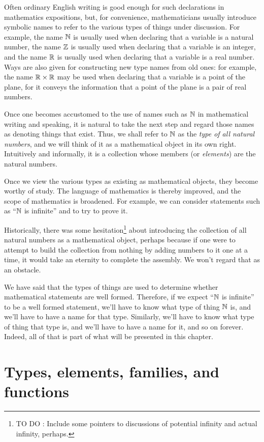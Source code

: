 Often ordinary English writing is good enough for such declarations in mathematics expositions, but, for convenience, mathematicians usually
introduce symbolic names to refer to the various types of things under discussion.  For example, the name $\mathbb{N}$ is usually used when declaring
that a variable is a natural number, the name $\mathbb{Z}$ is usually used when declaring that a variable is an integer, and the name $\mathbb{R}$ is usually
used when declaring that a variable is a real number.  Ways are also given for constructing new type names from old ones: for example, the name
$\mathbb{R}\times\mathbb{R}$ may be used when declaring that a variable is a point of the plane, for it conveys the information that a point of the plane is a
pair of real numbers.

Once one becomes accustomed to the use of names such as $\mathbb{N}$ in mathematical writing and speaking, it is natural to take the next step and
regard those names as denoting things that exist.  Thus, we shall refer to $\mathbb{N}$ as the \emph{type of all natural numbers}, and we will think of
it as a mathematical object in its own right.  Intuitively and informally, it is a collection whose members (or \emph{elements}) are the natural
numbers.

Once we view the various types as existing as mathematical objects, they become worthy of study.  The language of mathematics is thereby
improved, and the scope of mathematics is broadened.  For example, we can consider statements such as ``$\mathbb{N}$ is infinite'' and to try to prove
it.

Historically, there was some hesitation\footnote{TO DO : Include some pointers to discussions of potential infinity and actual infinity, perhaps.} about
introducing the collection of all natural numbers as a mathematical object, perhaps because if one were to attempt to build the collection from
nothing by adding numbers to it one at a time, it would take an eternity to complete the assembly.  We won't regard that as an obstacle.

We have said that the types of things are used to determine whether mathematical statements are well formed.
Therefore, if we expect ``$\mathbb{N}$ is infinite'' to be a well formed statement, we'll have to know what type of thing $\mathbb{N}$ is, and we'll
have to have a name for that type.  Similarly, we'll have to know what type of thing that type is, and we'll have to have a name for it,
and so on forever.  Indeed, all of that is part of what will be presented in this chapter.

\section{Types, elements, families, and functions}
\label{univalent-mathematics}

